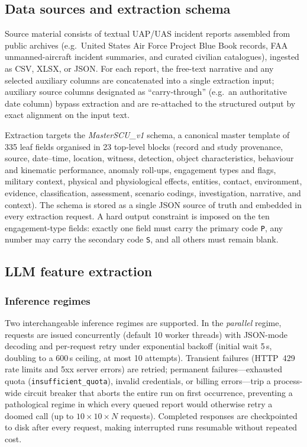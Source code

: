 \documentclass[11pt,a4paper]{article}
\begin{document}
\subsection{Data sources and extraction schema}

Source material consists of textual UAP/UAS incident reports assembled from public
archives (e.g.\ United States Air Force Project Blue Book records, FAA unmanned-aircraft
incident summaries, and curated civilian catalogues), ingested as CSV, XLSX, or JSON.
For each report, the free-text narrative and any selected auxiliary columns are
concatenated into a single extraction input; auxiliary source columns designated as
``carry-through'' (e.g.\ an authoritative date column) bypass extraction and are
re-attached to the structured output by exact alignment on the input text.

Extraction targets the \emph{MasterSCU\_v1} schema, a canonical master template of
335 leaf fields organised in 23 top-level blocks (record and study provenance, source,
date--time, location, witness, detection, object characteristics, behaviour and
kinematic performance, anomaly roll-ups, engagement types and flags, military context,
physical and physiological effects, entities, contact, environment, evidence,
classification, assessment, scenario codings, investigation, narrative, and context).
The schema is stored as a single JSON source of truth and embedded in every extraction
request. A hard output constraint is imposed on the ten engagement-type fields: exactly
one field must carry the primary code \texttt{P}, any number may carry the secondary
code \texttt{S}, and all others must remain blank.

\subsection{LLM feature extraction}

\subsubsection{Inference regimes}
Two interchangeable inference regimes are supported. In the \emph{parallel} regime,
requests are issued concurrently (default 10 worker threads) with JSON-mode decoding
and per-request retry under exponential backoff (initial wait 5\,s, doubling to a
600\,s ceiling, at most 10 attempts). Transient failures (HTTP~429 rate limits and
5xx server errors) are retried; permanent failures---exhausted quota
(\texttt{insufficient\_quota}), invalid credentials, or billing errors---trip a
process-wide circuit breaker that aborts the entire run on first occurrence, preventing
a pathological regime in which every queued report would otherwise retry a doomed call
(up to $10 \times 10 \times N$ requests). Completed responses are checkpointed to disk
after every request, making interrupted runs resumable without repeated cost.
\end{document}
